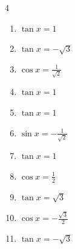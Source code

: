 \begin{multicols}{4}
\begin{enumerate}
  \item $\displaystyle \tan{x}  = 1$


  \item $\displaystyle \tan{x}  = -\sqrt{3}$


  \item $\displaystyle \cos{x}  = \frac{1}{\sqrt{2}}$


  \item $\displaystyle \tan{x}  = 1$


  \item $\displaystyle \tan{x}  = 1$


  \item $\displaystyle \sin{x}  = -\frac{1}{\sqrt{2}}$


  \item $\displaystyle \tan{x}  = 1$


  \item $\displaystyle \cos{x}  = \frac{1}{2}$


  \item $\displaystyle \tan{x}  = \sqrt{3}$


\columnbreak %

  \item $\displaystyle \cos{x}  = -\frac{\sqrt{3}}{2}$


  \item $\displaystyle \tan{x}  = -\sqrt{3}$



\end{enumerate}
\end{multicols}
